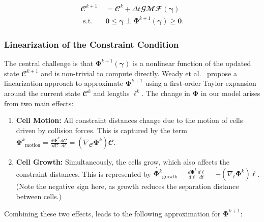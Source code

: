 \documentclass[conference]{IEEEtran}
\begin{document}
\begin{equation} \label{eq:colony_update_with_constraints}
    \begin{split}
        \mathbfcal{C}^{k+1} & = \mathbfcal{C}^k + \Delta t \mathbfcal{G} \mathbfcal{M} \mathbfcal{F}(\boldsymbol{\gamma})         \\
        \text{ s.t.} \quad  & \mathbf{0} \leq \boldsymbol{\gamma} \perp \mathbf{\Phi}^{k+1}(\boldsymbol{\gamma}) \geq \mathbf{0}.
    \end{split}
\end{equation}

\subsubsection{Linearization of the Constraint Condition}



The central challenge is that $\mathbf{\Phi}^{k+1}(\boldsymbol{\gamma})$ is a nonlinear function of the updated state $\mathbfcal{C}^{k+1}$ and is non-trivial to compute directly. Weady et al.~\cite{Weady2024} propose a linearization approach to approximate $\mathbf{\Phi}^{k+1}$ using a first-order Taylor expansion around the current state $\mathbfcal{C}^k$ and lengths $\boldsymbol{\ell}^k$. The change in $\mathbf{\Phi}$ in our model arises from two main effects:


\begin{enumerate}
    \item \textbf{Cell Motion:} All constraint distances change due to the motion of cells driven by collision forces. This is captured by the term $\dot{\mathbf{\Phi}^k}_{\text{motion}} = \frac{d \mathbf{\Phi}^k}{d \mathbfcal{C}} \frac{d \mathbfcal{C}}{dt} = (\nabla_{\mathbfcal{C}} \mathbf{\Phi}^k) \dot{\mathbfcal{C}}$.
    \item \textbf{Cell Growth:} Simultaneously, the cells grow, which also affects the constraint distances. This is represented by $\dot{\mathbf{\Phi}^k}_{\text{growth}} = \frac{d \mathbf{\Phi}^k}{d \boldsymbol{\ell}} \frac{d \boldsymbol{\ell}}{dt} =-(\nabla_{\boldsymbol{\ell}} \mathbf{\Phi}^k) \dot{\boldsymbol{\ell}}$. (Note the negative sign here, as growth reduces the separation distance between cells.)
\end{enumerate}

Combining these two effects, leads to the following approximation for $\mathbf{\Phi}^{k+1}$:
\end{document}

